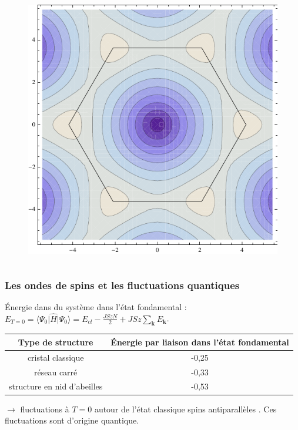 \documentclass[xcolor=dvipsnames]{beamer}
\newcommand{\bra}[1]{\ensuremath{\langle #1|}\xspace}
\newcommand{\h}{\ensuremath{\hat{H}}\xspace}
\newcommand{\fond}{\ensuremath{| \Psi_0 \rangle}\xspace}
\newcommand{\ond}{\ensuremath{\mathbf{k}\xspace}}
\newcommand{\1}{\ensuremath{\ket{\om_1\bom_1}}\xspace}
\newcommand{\2}{\ensuremath{\ket{\om_2\bom_2}}\xspace}
\begin{document}
\begin{frame}
\begin{columns}[t]
  \begin{column}{5cm}
   	\begin{figure}[htp]
	\centering
	\includegraphics[scale=0.50]{vector_img/contour_energie_zone_brill.pdf}
	\end{figure}
  \end{column}
 \end{columns}
\end{frame}

\begin{frame}
\frametitle{Les ondes de spins et les fluctuations quantiques}

Énergie dans du système dans l'état fondamental : $E_{T=0}=\bra{\Psi_0}\h\fond=E_{cl}-\frac{JSzN}{2}+JSz\sum_{\ond}E_{\ond}$.


\begin{tabular}{|c|c|}
\hline
	\textbf{Type de structure} & Énergie par liaison dans l'état fondamental\\
\hline
	cristal classique & -0,25\\
\hline
	réseau carré  & -0,33\\
\hline
	structure en nid d'abeilles & -0,53\\
\hline
\end{tabular}
$\rightarrow$ fluctuations à $T=0$ autour de l'état classique \og spins antiparallèles \fg{}. Ces fluctuations sont d'origine quantique.
\end{frame}
\end{document}
